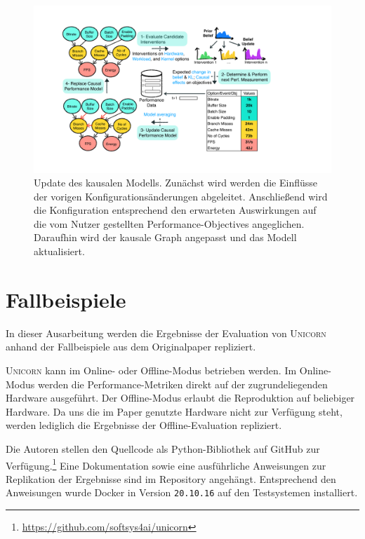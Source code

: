 \documentclass[11pt]{article}
\begin{document}
\begin{figure}[tp!]
  \centering
  \includegraphics[width=\linewidth]{./img/Causal-Model-Update.pdf}
  \caption{Update des kausalen Modells. Zunächst wird werden die Einflüsse der vorigen Konfigurationsänderungen abgeleitet. Anschließend wird die Konfiguration entsprechend den erwarteten Auswirkungen auf die vom Nutzer gestellten Performance-Objectives angeglichen. Daraufhin wird der kausale Graph angepasst und das Modell aktualisiert.}

  \label{}
\end{figure}

\section{Fallbeispiele}

In dieser Ausarbeitung werden die Ergebnisse der Evaluation von \textsc{Unicorn} anhand der Fallbeispiele aus dem Originalpaper repliziert.

\textsc{Unicorn} kann im Online- oder Offline-Modus betrieben werden. Im Online-Modus werden die Performance-Metriken direkt auf der zugrundeliegenden Hardware ausgeführt. Der Offline-Modus erlaubt die Reproduktion auf beliebiger Hardware. Da uns die im Paper genutzte Hardware nicht zur Verfügung steht, werden lediglich die Ergebnisse der Offline-Evaluation repliziert.

Die Autoren stellen den Quellcode als Python-Bibliothek auf GitHub zur Verfügung.\footnote{\href{https://github.com/softsys4ai/unicorn}{https://github.com/softsys4ai/unicorn}} Eine Dokumentation sowie eine ausführliche Anweisungen zur Replikation der Ergebnisse sind im Repository angehängt. Entsprechend den Anweisungen wurde Docker in Version \texttt{20.10.16} auf den Testsystemen installiert.
\end{document}
